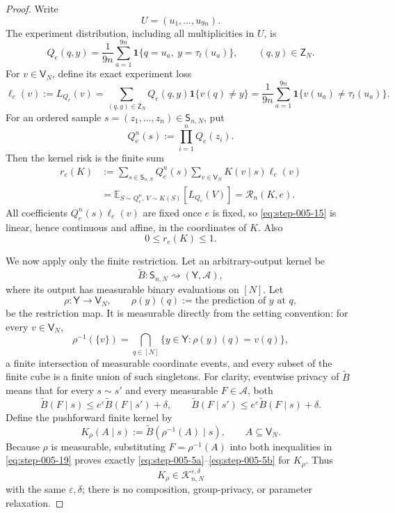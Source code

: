 \begin{proof}

Write
\[
U=(u_1,\ldots,u_{9n}).
\]
The experiment distribution, including all multiplicities in \(U\), is
\[
Q_e(q,y)
=
\frac1{9n}\sum_{a=1}^{9n}
\mathbf 1\{q=u_a,\ y=\tau_t(u_a)\},
\qquad (q,y)\in\mathsf Z_N.
\tag{12}\label{eq:step-005-12}
\]
For \(v \in \mathsf V_N\), define its exact experiment loss
\[
\ell_e(v)
:=L_{Q_e}(v)
=\sum_{(q,y)\in\mathsf Z_N}Q_e(q,y)\mathbf 1\{v(q)\ne y\}
=\frac1{9n}\sum_{a=1}^{9n}
\mathbf 1\{v(u_a)\ne\tau_t(u_a)\}.
\tag{13}\label{eq:step-005-13}
\]
For an ordered sample
\(s=(z_1,\ldots,z_n)\in\mathsf S_{n,N}\), put
\[
Q_e^n(s):=\prod_{i=1}^nQ_e(z_i).
\tag{14}\label{eq:step-005-14}
\]
Then the kernel risk is the finite sum
\[
\begin{aligned}
r_e(K)
&:=\sum_{s\in\mathsf S_{n,N}}Q_e^n(s)
\sum_{v\in\mathsf V_N}K(v\mid s)\ell_e(v)\\
&=\mathbb E_{S\sim Q_e^n,\,V\sim K(S)}[L_{Q_e}(V)]
=\mathcal R_n(K,e).
\end{aligned}
\tag{15}\label{eq:step-005-15}
\]
All coefficients
\(Q_e^n(s)\ell_e(v)\) are fixed once \(e\) is fixed, so \eqref{eq:step-005-15} is linear, hence continuous and affine, in the coordinates of \(K\). Also
\[
0\le r_e(K)\le1.
\tag{16}\label{eq:step-005-16}
\]

We now apply only the finite restriction. Let an arbitrary-output kernel be
\[
\widetilde B:\mathsf S_{n,N}\rightsquigarrow(\mathsf Y,\mathcal A),
\tag{17}\label{eq:step-005-17}
\]
where its output has measurable binary evaluations on \([N]\). Let
\[
\rho:\mathsf Y\longrightarrow\mathsf V_N,
\qquad
\rho(y)(q):=\text{the prediction of }y\text{ at }q,
\tag{18}\label{eq:step-005-18}
\]
be the restriction map. It is measurable directly from the setting convention: for every \(v \in \mathsf V_N\),
\[
\rho^{-1}(\{v\})
=\bigcap_{q\in[N]}
\{y\in\mathsf Y:\rho(y)(q)=v(q)\},
\tag{18a}\label{eq:step-005-18a}
\]
a finite intersection of measurable coordinate events, and every subset of the finite cube is a finite union of such singletons. For clarity, eventwise privacy of
\(\widetilde B\) means that for every \(s \sim s'\) and every measurable
\(F\in\mathcal A\), both
\[
\widetilde B(F\mid s)
\le e^\varepsilon\widetilde B(F\mid s')+\delta,
\qquad
\widetilde B(F\mid s')
\le e^\varepsilon\widetilde B(F\mid s)+\delta.
\tag{19}\label{eq:step-005-19}
\]
Define the pushforward finite kernel by
\[
K_\rho(A\mid s)
:=\widetilde B(\rho^{-1}(A)\mid s),
\qquad A\subseteq\mathsf V_N.
\tag{20}\label{eq:step-005-20}
\]
Because \(\rho\) is measurable, substituting
\(F=\rho^{-1}(A)\) into both inequalities in \eqref{eq:step-005-19} proves exactly \eqref{eq:step-005-5a}--\eqref{eq:step-005-5b} for \(K_\rho\). Thus
\[
K_\rho\in\mathcal K_{n,N}^{\varepsilon,\delta}
\tag{21}\label{eq:step-005-21}
\]
with the same \(\varepsilon,\delta\); there is no composition, group-privacy, or parameter relaxation.


\end{proof}
